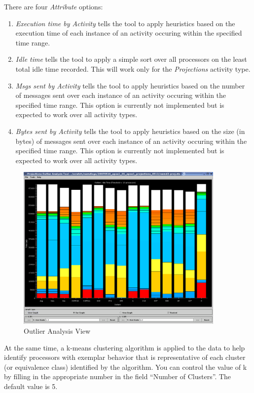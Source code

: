 There are four {\em Attribute} options:
\begin{enumerate}
\item {\em Execution time by Activity} tells the tool to apply heuristics
based on the execution time of each instance of an activity occuring
within the specified time range.
\item {\em Idle time} tells the tool to apply a simple sort over all
processors on the least total idle time recorded. This will work only for
the {\em Projections} activity type.
\item {\em Msgs sent by Activity} tells the tool to apply heuristics
based on the number of messages sent over each instance of an
activity occuring within the specified time range. This option is
currently not implemented but is expected to work over all activity
types.
\item {\em Bytes sent by Activity} tells the tool to apply heuristics
based on the size (in bytes) of messages sent over each instance of an
activity occuring within the specified time range. This option is
currently not implemented but is expected to work over all activity
types.
\end{enumerate}

\begin{figure}[htb]
\center
\includegraphics[width=4.0in]{fig/apoa1_512_outlierWithClusters}
\caption{Outlier Analysis View}
\label{outlier view}
\end{figure}

At the same time, a k-means clustering algorithm is applied to the
data to help identify processors with exemplar behavior that is
representative of each cluster (or equivalence class) identified by
the algorithm. You can control the value of k by filling in the
appropriate number in the field ``Number of Clusters''. The default
value is 5.

